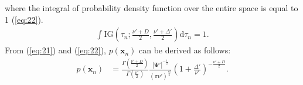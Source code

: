\documentclass[journal]{IEEEtran}
\begin{document}
where the integral of probability density function over the entire space is equal to 1 (\ref{eq:22}).
\begin{align}
\label{eq:22}
\int \mathrm{IG}(\tau_n;\frac{\nu'+D}{2},\frac{\nu'+\Delta'}{2}) \mathrm{d}{\tau_n}=1.
\end{align}
From (\ref{eq:21}) and (\ref{eq:22}), $p(\mathbf{x}_n)$ can be derived as follows:
\begin{align}
	p(\mathbf{x}_n) &= \frac{\Gamma(\frac{\nu'+D}{2})}{\Gamma(\frac{\nu'}{2})} \frac{|{\bm \Psi'}|^{-\frac{1}{2}}}{\left(\pi \nu' \right)^{\frac{D}{2}}} \left(1+\frac{\Delta '}{\nu '} \right)^{-\frac{\nu'+D}{2}}.
\end{align}


%







\ifCLASSOPTIONcaptionsoff
  \newpage
\fi
\end{document}
